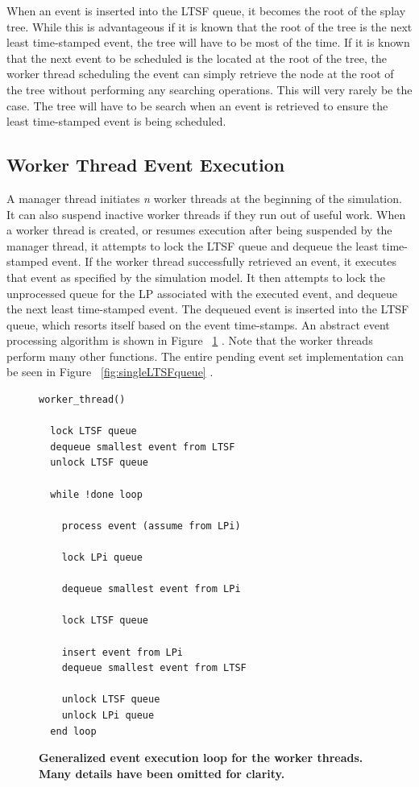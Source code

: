 \documentclass[11pt]{book}
\begin{document}
When an event is inserted into the LTSF queue, it becomes the root of the splay
tree.  While this is advantageous if it is known that the root of the tree is
the next least time-stamped event, the tree will have to be most of the time.
If it is known that the next event to be scheduled is the located at the root of
the tree, the worker thread scheduling the event can simply retrieve the node at
the root of the tree without performing any searching operations.  This will
very rarely be the case.  The tree will have to be search when an event is
retrieved to ensure the least time-stamped event is being scheduled.   

\subsection{Worker Thread Event Execution}

A manager thread initiates \emph{n} worker threads at the beginning of the simulation.
It can also suspend inactive worker threads if they run out of useful work.  When a worker
thread is created, or resumes execution after being suspended by the manager thread, it
attempts to lock the LTSF queue and dequeue the least time-stamped event.  If the worker
thread successfully retrieved an event, it executes that event as specified by the
simulation model.  It then attempts to lock the unprocessed queue for the LP associated
with the executed event, and dequeue the next least time-stamped event.  The dequeued
event is inserted into the LTSF queue, which resorts itself based on the event
time-stamps.  An abstract event processing algorithm is shown in Figure
~\ref{workerThreadAlgorithm} \cite{dickman}.  Note that the worker threads perform many
other functions.  The entire pending event set implementation can be seen in Figure
~\ref{fig:singleLTSFqueue} \cite{dickman}.

\linespread{1.0}
\begin{figure}
\begin{verbatim}
worker_thread()

  lock LTSF queue
  dequeue smallest event from LTSF
  unlock LTSF queue

  while !done loop

    process event (assume from LPi)

    lock LPi queue 

    dequeue smallest event from LPi

    lock LTSF queue

    insert event from LPi
    dequeue smallest event from LTSF

    unlock LTSF queue
    unlock LPi queue
  end loop
\end{verbatim}
\caption{\textbf{Generalized event execution loop for the worker threads.  Many details
    have been omitted for clarity.}}\label{workerThreadAlgorithm}
\end{figure}
\end{document}
